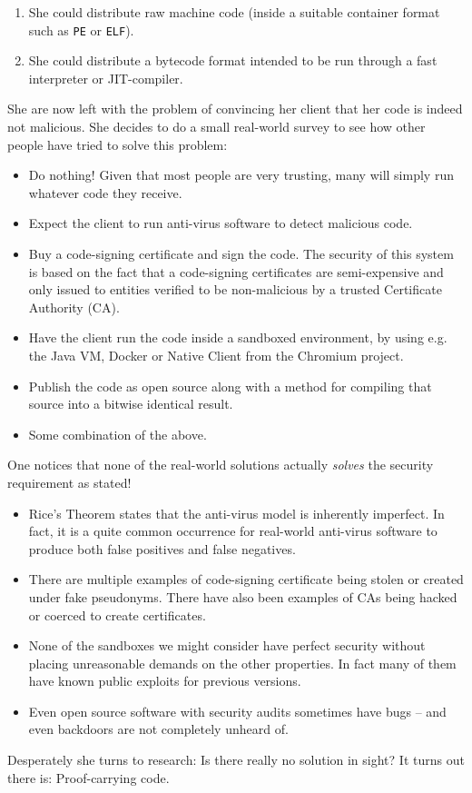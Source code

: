 \begin{enumerate}
\item She could distribute raw machine code (inside a suitable container format
  such as \texttt{PE} or \texttt{ELF}).
\item She could distribute a bytecode format intended to be run through a fast
  interpreter or JIT-compiler.
\end{enumerate}

She are now left with the problem of convincing her client that her code is
indeed not malicious. She decides to do a small real-world survey to see how
other people have tried to solve this problem:

\begin{itemize}
\item Do nothing! Given that most people are very trusting, many will simply run
  whatever code they receive.
\item Expect the client to run anti-virus software to detect malicious code.
\item Buy a code-signing certificate and sign the code. The security of this
  system is based on the fact that a code-signing certificates are
  semi-expensive and only issued to entities verified to be non-malicious by a
  trusted Certificate Authority (CA).
\item Have the client run the code inside a sandboxed environment, by using
  e.g. the Java VM, Docker or Native Client from the Chromium project.
\item Publish the code as open source along with a method for compiling that
  source into a bitwise identical result.
\item Some combination of the above.
\end{itemize}

One notices that none of the real-world solutions actually \emph{solves} the
security requirement as stated!

\begin{itemize}
\item Rice's Theorem states that the anti-virus model is inherently
  imperfect. In fact, it is a quite common occurrence for real-world anti-virus
  software to produce both false positives and false negatives.
\item There are multiple examples of code-signing certificate being stolen or
  created under fake pseudonyms. There have also been examples of CAs being
  hacked or coerced to create certificates.
\item None of the sandboxes we might consider have perfect security without
  placing unreasonable demands on the other properties. In fact many of them
  have known public exploits for previous versions.
\item Even open source software with security audits sometimes have bugs -- and
  even backdoors are not completely unheard of.
\end{itemize}


Desperately she turns to research: Is there really no solution in sight? It
turns out there is: Proof-carrying code.

